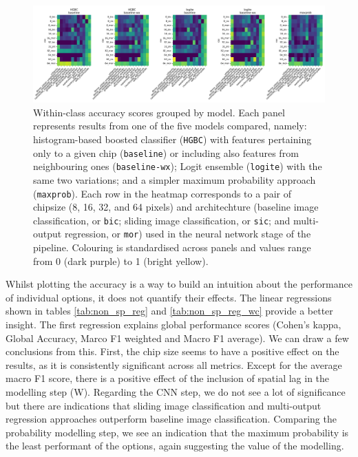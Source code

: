 \documentclass[]{interact}
\theoremstyle{plain}%
\theoremstyle{definition}
\theoremstyle{remark}
\begin{document}
\begin{figure}
    \centering
    \includegraphics[width=1.0\linewidth]{fig/wc_accuracy_x_model.png}
    \caption{\footnotesize Within-class accuracy scores grouped by model. Each panel
    represents results from one of the five models compared, namely:
    histogram-based boosted classifier (\texttt{HGBC}) with features
    pertaining only to a given chip (\texttt{baseline}) or including also features
    from neighbouring ones (\texttt{baseline-wx}); Logit ensemble
    (\texttt{logite}) with the same two variations; and a simpler maximum
    probability approach (\texttt{maxprob}). Each row in the heatmap
    corresponds to a pair of chipsize (8, 16, 32, and 64 pixels)
    and architechture (baseline image classification, or \texttt{bic}; sliding
            image classification, or \texttt{sic}; and multi-output
    regression, or \texttt{mor}) used in the neural network stage of the
    pipeline. Colouring is standardised across panels and values range from
    0 (dark purple) to 1 (bright yellow).}
    \label{fig:wc_accuracy_x_model}
\end{figure}

Whilst plotting the accuracy is a way to build an intuition about the performance of
individual options, it does not quantify their effects. The linear regressions shown in
tables \ref{tab:non_sp_reg} and \ref{tab:non_sp_reg_wc} provide a better insight. The
first regression explains global performance scores (Cohen's kappa, Global Accuracy, Marco F1
weighted and Macro F1 average). We can draw a few conclusions from this. First, the chip size
seems to have a positive effect on the results, as it is consistently
significant across all metrics. Except for the average macro F1 score, there is a
positive effect of the inclusion of spatial lag in the modelling step (W). Regarding the
CNN step, we do not see a lot of significance but there are indications that sliding
image classification and multi-output regression approaches outperform baseline image
classification. Comparing the probability modelling step, we see an indication that the
maximum probability is the least performant of the options, again suggesting the value
of the modelling.
\end{document}
